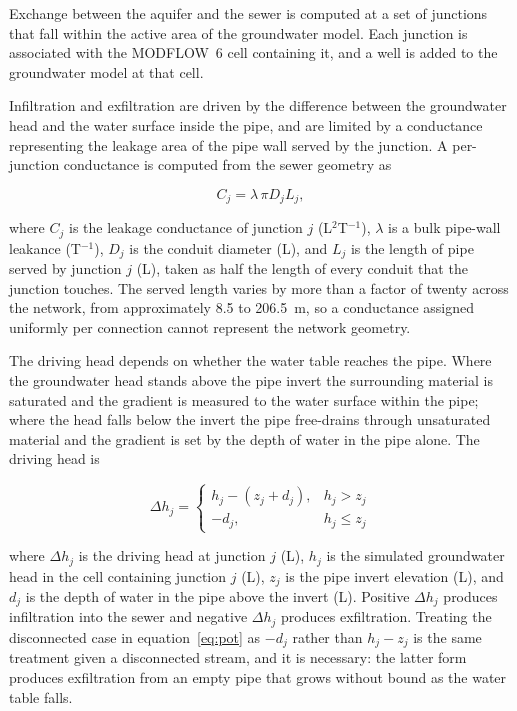 \documentclass[preprint,authoryear,11pt]{elsarticle}
\begin{document}
Exchange between the aquifer and the sewer is computed at a set of junctions that fall within the active area of the groundwater model. Each junction is associated with the MODFLOW~6 cell containing it, and a well is added to the groundwater model at that cell.

Infiltration and exfiltration are driven by the difference between the groundwater head and the water surface inside the pipe, and are limited by a conductance representing the leakage area of the pipe wall served by the junction. A per-junction conductance is computed from the sewer geometry as

\begin{equation}
  C_{j} = \lambda \, \pi D_{j} L_{j} ,
  \label{eq:pipecond}
\end{equation}

\noindent where $C_{j}$ is the leakage conductance of junction $j$ (L$^{2}$T$^{-1}$), $\lambda$ is a bulk pipe-wall leakance (T$^{-1}$), $D_{j}$ is the conduit diameter (L), and $L_{j}$ is the length of pipe served by junction $j$ (L), taken as half the length of every conduit that the junction touches. The served length varies by more than a factor of twenty across the network, from approximately 8.5 to \SI{206.5}{\meter}, so a conductance assigned uniformly per connection cannot represent the network geometry.

The driving head depends on whether the water table reaches the pipe. Where the groundwater head stands above the pipe invert the surrounding material is saturated and the gradient is measured to the water surface within the pipe; where the head falls below the invert the pipe free-drains through unsaturated material and the gradient is set by the depth of water in the pipe alone. The driving head is

\begin{equation}
  \Delta h_{j} =
  \begin{cases}
    h_{j} - \left( z_{j} + d_{j} \right), & h_{j} > z_{j} \\[4pt]
    -d_{j},                                & h_{j} \le z_{j}
  \end{cases}
  \label{eq:pot}
\end{equation}

\noindent where $\Delta h_{j}$ is the driving head at junction $j$ (L), $h_{j}$ is the simulated groundwater head in the cell containing junction $j$ (L), $z_{j}$ is the pipe invert elevation (L), and $d_{j}$ is the depth of water in the pipe above the invert (L). Positive $\Delta h_{j}$ produces infiltration into the sewer and negative $\Delta h_{j}$ produces exfiltration. Treating the disconnected case in equation~\ref{eq:pot} as $-d_{j}$ rather than $h_{j} - z_{j}$ is the same treatment given a disconnected stream, and it is necessary: the latter form produces exfiltration from an empty pipe that grows without bound as the water table falls.
\end{document}

